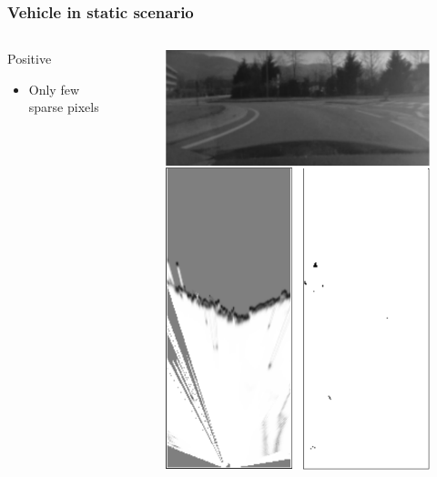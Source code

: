 \documentclass{beamer}
\begin{document}
	\begin{frame}
		\frametitle{Vehicle in static scenario}
		
		\begin{columns}[t]
			\begin{column}[t]{5cm}
				\begin{exampleblock}{Positive}
				\begin{itemize}
				\item Only few sparse pixels
				\end{itemize}
				\end{exampleblock}		
			\end{column}
			\begin{column}[t]{5cm}
				\begin{figure}[h]
				\center
				\includegraphics[scale=0.55]{../img/fig:result:scenestatic}
				\end{figure}
			\end{column}
		\end{columns}
	\end{frame}			
\end{document}
